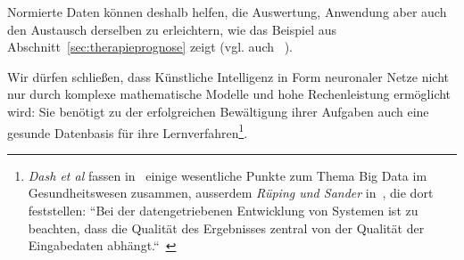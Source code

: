 Normierte Daten können deshalb helfen, die Auswertung, Anwendung aber auch den Austausch derselben zu erleichtern, wie das Beispiel aus Abschnitt~\ref{sec:therapieprognose} zeigt (vgl. auch ~\cite[42]{AHR19}).

Wir dürfen schließen, dass Künstliche Intelligenz in Form neuronaler Netze nicht nur durch komplexe mathematische Modelle und hohe Rechenleistung ermöglicht wird: Sie benötigt zu der erfolgreichen Bewältigung ihrer Aufgaben auch eine gesunde Datenbasis für ihre Lernverfahren\footnote{
    \textit{Dash et al} fassen in~\cite{SSM+19} einige wesentliche Punkte zum Thema Big Data im Gesundheitswesen zusammen, ausserdem \textit{Rüping und Sander} in~\cite{RS19}, die dort feststellen: ``Bei der datengetriebenen Entwicklung von Systemen ist zu beachten, dass die Qualität des Ergebnisses zentral von der Qualität der Eingabedaten abhängt.``~\cite[19]{RS19}
}.













%
%
%
%

